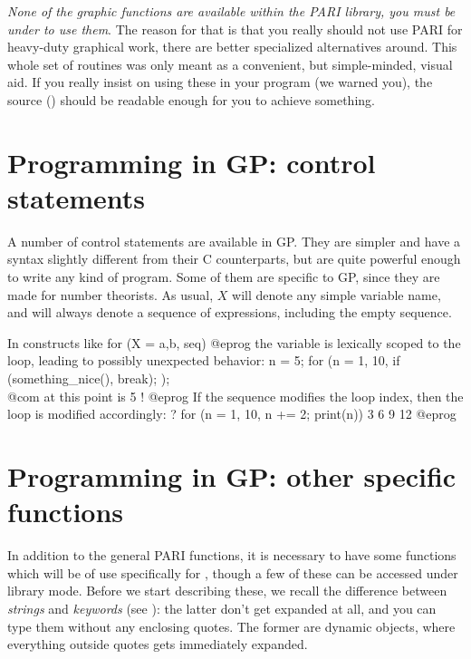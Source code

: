  \emph{None of the graphic functions are available
within the PARI library, you must be under  to use them}. The reason
for that is that you really should not use PARI for heavy-duty graphical work,
there are better specialized alternatives around. This whole set of routines
was only meant as a convenient, but simple-minded, visual aid. If you really
insist on using these in your program (we warned you), the source
() should be readable enough for you to achieve something.


\section{Programming in GP: control statements}
\label{se:programming}

  A number of control statements are available in GP. They are simpler and
have a syntax slightly different from their C counterparts, but are quite
powerful enough to write any kind of program. Some of them are specific to
GP, since they are made for number theorists. As usual, $X$ will denote any
simple variable name, and  will always denote a sequence of
expressions, including the empty sequence.

 In constructs like
\bprog
    for (X = a,b, seq)
@eprog\noindent
the variable  is lexically scoped to the loop, leading to possibly
unexpected behavior:
\bprog
    n = 5;
    for (n = 1, 10,
      if (something_nice(), break);
    );
    \\ @com at this point  is 5 !
@eprog\noindent
If the sequence  modifies the loop index, then the loop
is modified accordingly:
\bprog
    ? for (n = 1, 10, n += 2; print(n))
    3
    6
    9
    12
@eprog


\section{Programming in GP: other specific functions}
\label{se:gp_program}

  In addition to the general PARI functions, it is necessary to have some
functions which will be of use specifically for , though a few of these can
be accessed under library mode. Before we start describing these, we recall
the difference between \emph{strings} and \emph{keywords} (see
): the latter don't get expanded at all, and you can type
them without any enclosing quotes. The former are dynamic objects, where
everything outside quotes gets immediately expanded.

